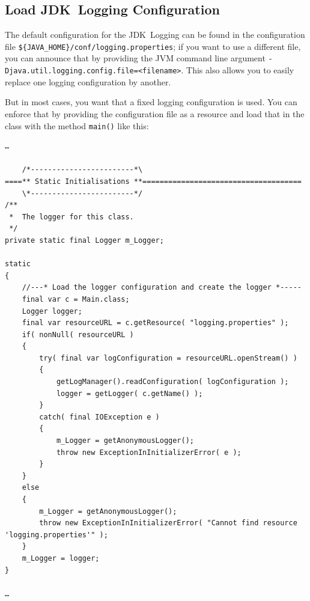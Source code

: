 


\subsection{Load JDK~Logging Configuration}\label{sec:LoadJDKLoggingConfiguration}
The default configuration for the JDK~Logging can be found in the configuration file \texttt{\$\{JAVA\_HOME\}/conf/logging.properties}; if you want to use a different file, you can announce that by providing the JVM command line argument \texttt{-Djava.util.logging.config.file=<filename>}. This also allows you to easily replace one logging configuration by another.

But in most cases, you want that a fixed logging configuration is used. You can enforce that by providing the configuration file as a resource and load that in the class with the method \lstinline|main()| like this:
\begin{lstlisting}[caption={Load Logging Configuration from Resource}]
…

    /*------------------------*\
====** Static Initialisations **=====================================
    \*------------------------*/
/**
 *  The logger for this class.
 */
private static final Logger m_Logger;

static
{
    //---* Load the logger configuration and create the logger *-----
    final var c = Main.class;
    Logger logger;
    final var resourceURL = c.getResource( "logging.properties" );
    if( nonNull( resourceURL )
    {
        try( final var logConfiguration = resourceURL.openStream() )
        {
            getLogManager().readConfiguration( logConfiguration );
            logger = getLogger( c.getName() );
        }
        catch( final IOException e )
        {
            m_Logger = getAnonymousLogger();
            throw new ExceptionInInitializerError( e );
        }
    }
    else
    {
        m_Logger = getAnonymousLogger();
        throw new ExceptionInInitializerError( "Cannot find resource 'logging.properties'" );
    }
    m_Logger = logger;
}

…
\end{lstlisting}

